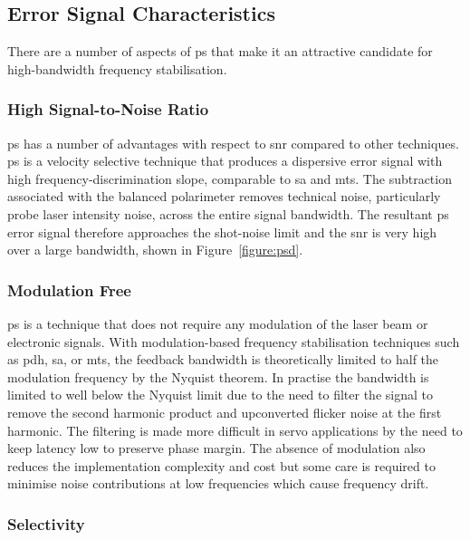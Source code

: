 \subsection{Error Signal Characteristics}

There are a number of aspects of \gls{ps} that make it an attractive candidate for high-bandwidth frequency stabilisation.

\subsubsection{High Signal-to-Noise Ratio}

\Gls{ps} has a number of advantages with respect to \gls{snr} compared to other techniques.
\Gls{ps} is a velocity selective technique that produces a dispersive error signal with high frequency-discrimination slope, comparable to \gls{sa} and \gls{mts}.
The subtraction associated with the balanced polarimeter removes technical noise, particularly probe laser intensity noise, across the entire signal bandwidth.
The resultant \gls{ps} error signal therefore approaches the shot-noise limit and the \gls{snr} is very high over a large bandwidth, shown in Figure~\ref{figure:psd}.

\subsubsection{Modulation Free}

\Gls{ps} is a technique that does not require any modulation of the laser beam or electronic signals.
With modulation-based frequency stabilisation techniques such as \gls{pdh}, \gls{sa}, or \gls{mts}, the feedback bandwidth is theoretically limited to half the modulation frequency by the Nyquist theorem.
In practise the bandwidth is limited to well below the Nyquist limit due to the need to filter the signal to remove the second harmonic product and upconverted flicker noise at the first harmonic.
The filtering is made more difficult in servo applications by the need to keep latency low to preserve phase margin.
The absence of modulation also reduces the implementation complexity and cost but some care is required to minimise noise contributions at low frequencies which cause frequency drift.

\subsubsection{Selectivity}\label{section:capture_range}

